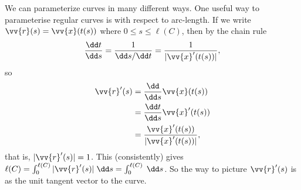 We can parameterize curves in many different ways. One useful way to parameterise regular curves is with respect to arc-length.
If we write $\vv{r}(s) = \vv{x}(t(s))$ where $0 \leq s \leq \ell(C)$, then by the chain rule
$$
	\frac{\dd t}{\dd s} = \frac{1}{\dd s/ \dd t} = \frac{1}{|\vv{x}'(t(s))|},
$$
so
\begin{align*}
	\vv{r}'(s) &= \frac{\dd}{\dd s} \vv{x}(t(s)) \\
	&= \frac{\dd t}{\dd s} \vv{x}'(t(s)) \\
	&= \frac{\vv{x}'(t(s))}{|\vv{x}'(t(s))|},
\end{align*}
that is, $|\vv{r}'(s)| = 1$. This (consistently) gives $\ell(C) = \int_0^{\ell(C)} |\vv{r}'(s)| \; \dd s = \int_0^{\ell(C)} \; \dd s$.
So the way to picture $\vv{r}'(s)$ is as the unit tangent vector to the curve.

